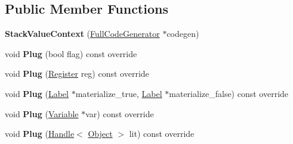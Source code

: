 \subsection*{Public Member Functions}
\begin{DoxyCompactItemize}
\item 
{\bfseries Stack\+Value\+Context} (\hyperlink{classv8_1_1internal_1_1_full_code_generator}{Full\+Code\+Generator} $\ast$codegen)\hypertarget{classv8_1_1internal_1_1_full_code_generator_1_1_stack_value_context_a8f98af2d6395c241ed42b04f6d3f01f8}{}\label{classv8_1_1internal_1_1_full_code_generator_1_1_stack_value_context_a8f98af2d6395c241ed42b04f6d3f01f8}

\item 
void {\bfseries Plug} (bool flag) const  override\hypertarget{classv8_1_1internal_1_1_full_code_generator_1_1_stack_value_context_a2d273983517f531eaae16cdbfb21848c}{}\label{classv8_1_1internal_1_1_full_code_generator_1_1_stack_value_context_a2d273983517f531eaae16cdbfb21848c}

\item 
void {\bfseries Plug} (\hyperlink{structv8_1_1internal_1_1_register}{Register} reg) const  override\hypertarget{classv8_1_1internal_1_1_full_code_generator_1_1_stack_value_context_a7b1275bc00dd531fabc50192ac70b06a}{}\label{classv8_1_1internal_1_1_full_code_generator_1_1_stack_value_context_a7b1275bc00dd531fabc50192ac70b06a}

\item 
void {\bfseries Plug} (\hyperlink{classv8_1_1internal_1_1_label}{Label} $\ast$materialize\+\_\+true, \hyperlink{classv8_1_1internal_1_1_label}{Label} $\ast$materialize\+\_\+false) const  override\hypertarget{classv8_1_1internal_1_1_full_code_generator_1_1_stack_value_context_ac036a10d5ce5b7ae6d0d81a75c036238}{}\label{classv8_1_1internal_1_1_full_code_generator_1_1_stack_value_context_ac036a10d5ce5b7ae6d0d81a75c036238}

\item 
void {\bfseries Plug} (\hyperlink{classv8_1_1internal_1_1_variable}{Variable} $\ast$var) const  override\hypertarget{classv8_1_1internal_1_1_full_code_generator_1_1_stack_value_context_aa98a22a383a520442e0d434d816f321a}{}\label{classv8_1_1internal_1_1_full_code_generator_1_1_stack_value_context_aa98a22a383a520442e0d434d816f321a}

\item 
void {\bfseries Plug} (\hyperlink{classv8_1_1internal_1_1_handle}{Handle}$<$ \hyperlink{classv8_1_1internal_1_1_object}{Object} $>$ lit) const  override\hypertarget{classv8_1_1internal_1_1_full_code_generator_1_1_stack_value_context_a63b17e5f0b72bd0e87471caf9b2a48f8}{}\label{classv8_1_1internal_1_1_full_code_generator_1_1_stack_value_context_a63b17e5f0b72bd0e87471caf9b2a48f8}


\end{DoxyCompactItemize}
